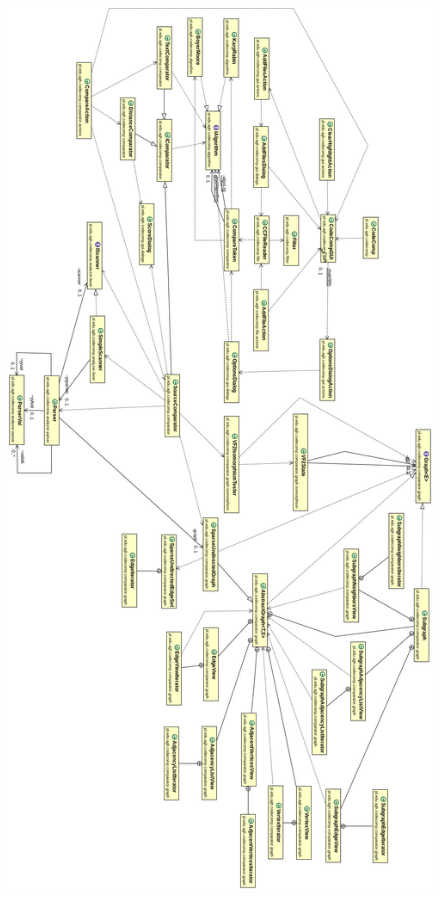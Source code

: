\documentclass[a4paper,12pt]{article}
\begin{document}
\begin{figure}[!]
\centering
\includegraphics[scale=0.3]{gfx/ClassDiagram2.png}
\end{figure}
\end{document}
